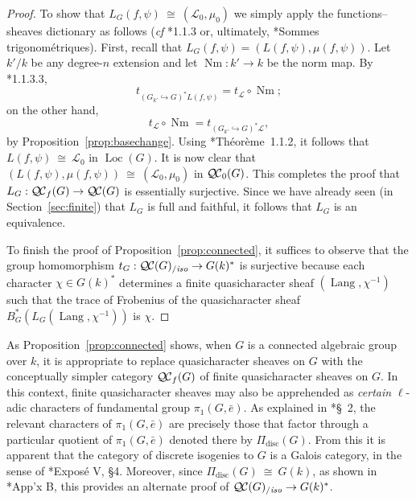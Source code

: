 \documentclass[11pt]{amsart}
\theoremstyle{plain}
\theoremstyle{definition}
\theoremstyle{remark}
\newcommand{\bFq}{\bar{k}}
\newcommand{\Fq}{k}
\DeclareMathOperator{\Gal}{Gal}
\DeclareMathOperator{\Nm}{Nm}
\newcommand{\iso}{{\ \cong\ }}
\newcommand{\qcs}[1]{{\mathcal{#1}}}
\newcommand{\QC}{{\mathcal{Q\hskip-0.8pt C}}}
\newcommand{\QCb}{{\QC_0}}
\newcommand{\QCf}{{\QC_f}}
\newcommand{\QCiso}[1]{\QC(#1)_{/\textit{iso}}}
\newcommand{\Lang}{{\operatorname{Lang}}}
\newcommand{\Loc}{{\operatorname{Loc}}}
\newcommand{\trFrob}[1]{t_{#1}}
\begin{document}
\begin{proof}
  To show that $L_G(f,\psi) \iso (\qcs{L}_0,\mu_0)$ we simply apply the functions--sheaves dictionary
  as follows ({\it cf} \cite{laumon:87a}*{1.1.3} or, ultimately, \cite{deligne:SGA4.5}*{Sommes trigonométriques}).
  First, recall that $L_G(f,\psi) = (L(f,\psi), \mu(f,\psi))$.
  Let $k'/k$ be any degree-$n$ extension and let $\Nm : k'\to k$ be the norm map. 
  By \cite{laumon:87a}*{1.1.3.3}, 
  \[
  \trFrob{(G_{k'}\hookrightarrow G)^*L(f,\psi)} = \trFrob{\qcs{L}} \circ \Nm;
  \]
  on the other hand, 
  \[
  \trFrob{\qcs{L}} \circ \Nm = \trFrob{(G_{k'}\hookrightarrow G)^*\qcs{L}},
  \]
   by Proposition~\ref{prop:basechange}.
  Using \cite{laumon:87a}*{Th\'eor\`eme~1.1.2}, it follows that  $L(f,\psi) \iso \qcs{L}_0$ in $\Loc(G)$.
  It is now clear that $(L(f,\psi),\mu(f,\psi)) \iso (\qcs{L}_0,\mu_0)$ in $\QCb(G)$.
  This completes the proof that $L_G : \QCf(G) \to \QC(G)$ is essentially surjective.
  Since we have already seen (in Section~\ref{sec:finite}) that $L_G$ is full and faithful, 
  it follows that $L_G$ is an equivalence.
  
  To finish the proof of Proposition~\ref{prop:connected}, it suffices to observe that the group homomorphism
  $
  \trFrob{G} : \QCiso{G} \to G(\Fq)^*
  $
  is surjective because each character $\chi \in G(\Fq)^*$ determines a finite quasicharacter
  sheaf $(\Lang,\chi^{-1})$ such that the trace of Frobenius of the quasicharacter sheaf
  $B_G^* (L_G(\Lang,\chi^{-1}))$ is $\chi$.
\end{proof}

As Proposition~\ref{prop:connected} shows, 
when $G$ is a connected algebraic group over $\Fq$, 
it is appropriate to replace quasicharacter sheaves on $G$ 
with the conceptually simpler category $\QCf(G)$ of finite quasicharacter sheaves on $G$. 
In this context, finite quasicharacter sheaves may also be apprehended as
\emph{certain} $\ell$-adic characters of fundamental group $\pi_1(G,{\bar e})$. 
As explained in \cite{kamgarpour:09a}*{\S~2}, 
the relevant characters of $\pi_1(G,{\bar e})$ are precisely those 
that factor through a particular quotient of $\pi_1(G,{\bar e})$ 
denoted there by $\Pi_\text{disc}(G)$.
From this it is apparent that the category of discrete isogenies to $G$ is a Galois category,
in the sense of \cite{grothendieck:SGA1}*{Expos\'e V, \S 4}. Moreover, since $\Pi_\text{disc}(G) \iso G(\Fq)$,
as shown in \cite{kamgarpour:09a}*{App'x B}, this provides an alternate proof of $\QCiso{G} \to G(\Fq)^*$.
\end{document}
